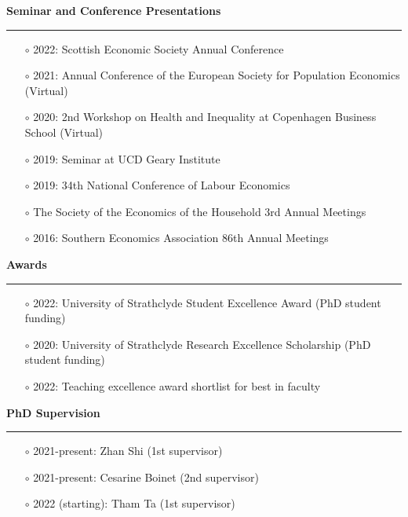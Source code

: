\documentclass[12pt,a4paper]{article}
\begin{document}
		\bigskip

	\noindent \textbf{\textsf{{\large Seminar and Conference Presentations}}}  \vspace{0.1cm} \hrule \vspace{0.2cm}		

		\begin{itemize}
		\item[$\circ$] 2022: Scottish Economic Society Annual Conference	
		\item[$\circ$] 2021: Annual Conference of the European Society for Population Economics (Virtual)
		\item[$\circ$] 2020: 2nd Workshop on Health and Inequality at Copenhagen Business School (Virtual)
		\item[$\circ$] 2019: Seminar at UCD Geary Institute
		\item[$\circ$] 2019: 34th National Conference of Labour Economics
		\item[$\circ$] The Society of the Economics of the Household 3rd Annual Meetings
		\item[$\circ$] 2016: Southern Economics Association 86th Annual Meetings 
		\end{itemize}

	\bigskip

	\noindent \textbf{\textsf{{\large Awards}}}  \vspace{0.1cm} \hrule \vspace{0.2cm}

		\begin{itemize}
			\item[$\circ$] 2022: University of Strathclyde Student Excellence Award (PhD student funding)
			\item[$\circ$] 2020: University of Strathclyde Research Excellence Scholarship (PhD student funding)
			\item[$\circ$] 2022: Teaching excellence award shortlist for best in faculty
		\end{itemize}

	\bigskip

	\noindent \textbf{\textsf{{\large PhD Supervision}}}  \vspace{0.1cm} \hrule \vspace{0.2cm}

		\begin{itemize}
			\item[$\circ$] 2021-present: Zhan Shi (1st supervisor)
			\item[$\circ$] 2021-present: Cesarine Boinet (2nd supervisor)
			\item[$\circ$] 2022 (starting): Tham Ta (1st supervisor)
		\end{itemize}
\end{document}
